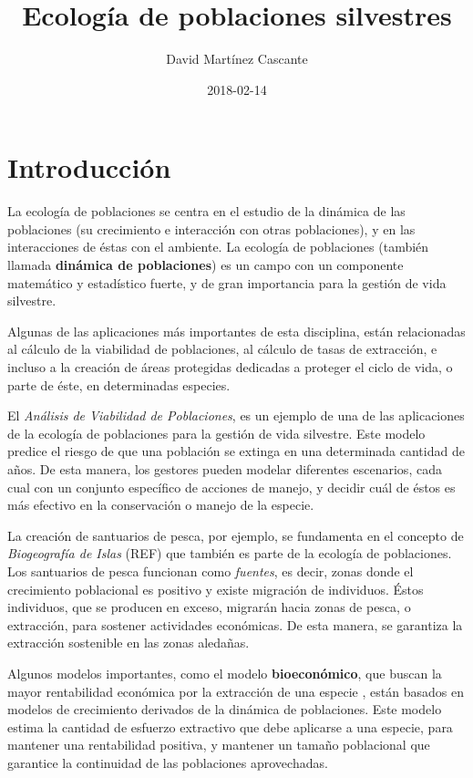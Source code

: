 \documentclass[12pt,letterpaper,]{book}
\title{Ecología de poblaciones silvestres}
\author{David Martínez Cascante}
\date{2018-02-14}
\begin{document}
\maketitle

{
\setcounter{tocdepth}{1}
\tableofcontents
}
\chapter{Introducción}\label{intro}

La ecología de poblaciones se centra en
el estudio de la dinámica de las
poblaciones (su crecimiento e
interacción con otras poblaciones), y en las interacciones de éstas con
el ambiente. La ecología de poblaciones (también llamada
\textbf{dinámica de poblaciones}) es un campo con un componente
matemático y estadístico fuerte, y de gran importancia para la gestión
de vida silvestre.

Algunas de las aplicaciones más importantes de esta disciplina, están
relacionadas al cálculo de la viabilidad de poblaciones, al cálculo de
tasas de extracción, e incluso a la creación de áreas protegidas
dedicadas a proteger el ciclo de vida, o parte de éste, en determinadas
especies.

El \emph{Análisis de Viabilidad de Poblaciones}, es un ejemplo de una de
las aplicaciones de la ecología de poblaciones para la gestión de vida
silvestre. Este modelo predice el riesgo de que una población se extinga
en una determinada cantidad de años. De esta manera, los gestores pueden
modelar diferentes escenarios, cada cual con un conjunto específico de
acciones de manejo, y decidir cuál de éstos es más efectivo en la
conservación o manejo de la especie.

La creación de santuarios de pesca, por ejemplo, se fundamenta en el
concepto de \emph{Biogeografía de Islas} (REF) que también es parte de
la ecología de poblaciones. Los santuarios de pesca funcionan como
\emph{fuentes}, es decir, zonas donde el crecimiento poblacional es
positivo y existe migración de individuos. Éstos individuos, que se
producen en exceso, migrarán hacia zonas de pesca, o extracción, para
sostener actividades económicas. De esta manera, se garantiza la
extracción sostenible en las zonas aledañas.

Algunos modelos importantes, como el modelo \textbf{bioeconómico}, que
buscan la mayor rentabilidad económica por la extracción de una especie
\citep{Grafton2006}, están basados en modelos de crecimiento derivados
de la dinámica de poblaciones. Este modelo estima la cantidad de
esfuerzo extractivo que debe aplicarse a una especie, para mantener una
rentabilidad positiva, y mantener un tamaño poblacional que garantice la
continuidad de las poblaciones aprovechadas.
\end{document}
